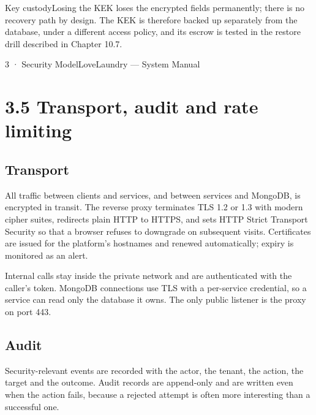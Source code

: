 \documentclass[11pt,a4paper,oneside]{book}
\begin{document}
\begin{notebox}Key custodyLosing the KEK loses the encrypted fields permanently; there is no recovery path by design. The KEK is therefore backed up separately from the database, under a different access policy, and its escrow is tested in the restore drill described in Chapter 10.7.\end{notebox}
3 · Security ModelLoveLaundry — System Manual

\section{3.5 Transport, audit and rate limiting}
\subsection*{Transport}
All traffic between clients and services, and between services and MongoDB, is encrypted in transit. The reverse proxy terminates TLS 1.2 or 1.3 with modern cipher suites, redirects plain HTTP to HTTPS, and sets HTTP Strict Transport Security so that a browser refuses to downgrade on subsequent visits. Certificates are issued for the platform's hostnames and renewed automatically; expiry is monitored as an alert.

Internal calls stay inside the private network and are authenticated with the caller's token. MongoDB connections use TLS with a per-service credential, so a service can read only the database it owns. The only public listener is the proxy on port 443.

\subsection*{Audit}
Security-relevant events are recorded with the actor, the tenant, the action, the target and the outcome. Audit records are append-only and are written even when the action fails, because a rejected attempt is often more interesting than a successful one.
\end{document}

